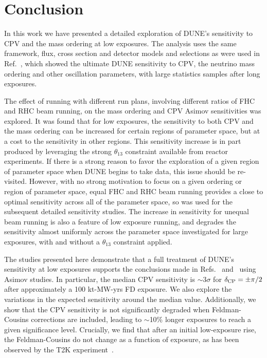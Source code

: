 \section{Conclusion}
\label{sec:conclude}

In this work we have presented a detailed exploration of DUNE's sensitivity to CPV and the mass ordering at low exposures. The analysis uses the same framework, flux, cross section and detector models and selections as were used in Ref.~\cite{Abi:2020qib}, which showed the ultimate DUNE sensitivity to CPV, the neutrino mass ordering and other oscillation parameters, with large statistics samples after long exposures.

The effect of running with different run plans, involving different ratios of FHC and RHC beam running, on the mass ordering and CPV Asimov sensitivities was explored. It was found that for low exposures, the sensitivity to both CPV and the mass ordering can be increased for certain regions of parameter space, but at a cost to the sensitivity in other regions. This sensitivity increase is in part produced by leveraging the strong $\theta_{13}$ constraint available from reactor experiments. If there is a strong reason to favor the exploration of a given region of parameter space when DUNE begins to take data, this issue should be re-visited. However, with no strong motivation to focus on a given ordering or region of \deltacp parameter space, equal FHC and RHC beam running provides a close to optimal sensitivity across all of the parameter space, so was used for the subsequent detailed sensitivity studies. The increase in sensitivity for unequal beam running is also a feature of low exposure running, and degrades the sensitivity almost uniformly across the parameter space investigated for large exposures, with and without a $\theta_{13}$ constraint applied.

The studies presented here demonstrate that a full treatment of DUNE's sensitivity at low exposures supports the conclusions made in Refs.~\cite{Abi:2020qib} and~\cite{Abi:2020evt} using Asimov studies. In particular, the median CPV sensitivity is $\sim$3$\sigma$ for $\delta_{\rm CP} = \pm\pi/2$ after approximately a 100 kt-MW-yrs FD exposure. We also explore the variations in the expected sensitivity around the median value. Additionally, we show that the CPV sensitivity is not significantly degraded when Feldman-Cousins corrections are included, leading to $\sim$10\% longer exposures to reach a given significance level. Crucially, we find that after an initial low-exposure rise, the Feldman-Cousins \dchisqcrit do not change as a function of exposure, as has been observed by the T2K experiment~\cite{Abe:2021gky}.

